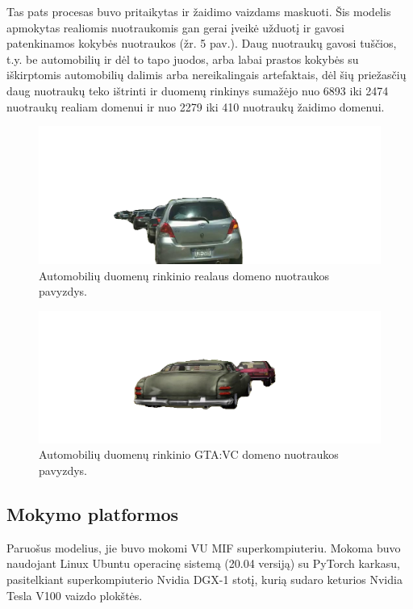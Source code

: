 \documentclass{VUMIFPSbakalaurinis}
\begin{document}
            Tas pats procesas buvo pritaikytas ir žaidimo vaizdams maskuoti. Šis modelis apmokytas realiomis nuotraukomis gan gerai įveikė užduotį ir gavosi patenkinamos kokybės nuotraukos (žr. 5 pav.). Daug nuotraukų gavosi tuščios, t.y. be automobilių ir dėl to tapo juodos, arba labai prastos kokybės su iškirptomis automobilių dalimis arba nereikalingais artefaktais, dėl šių priežasčių daug nuotraukų teko ištrinti ir duomenų rinkinys sumažėjo nuo 6893 iki 2474 nuotraukų realiam domenui ir nuo 2279 iki 410 nuotraukų žaidimo domenui.

            \begin{figure}[H]
                \centering
                \includegraphics[scale=0.65]{img/segmentation/real_pvz}
                \caption{Automobilių duomenų rinkinio realaus domeno nuotraukos pavyzdys.}
                \label{img:mlp}
            \end{figure}

            \begin{figure}[H]
                \centering
                \includegraphics[scale=0.75]{img/segmentation/vc_pvz}
                \caption{Automobilių duomenų rinkinio GTA:VC domeno nuotraukos pavyzdys.}
                \label{img:mlp}
            \end{figure}
            
    \subsection{Mokymo platformos}
        Paruošus modelius, jie buvo mokomi VU MIF superkompiuteriu. Mokoma buvo naudojant Linux Ubuntu operacinę sistemą (20.04 versiją) su PyTorch karkasu, pasitelkiant superkompiuterio Nvidia DGX-1 stotį, kurią sudaro keturios Nvidia Tesla V100 vaizdo plokštės.
\end{document}
